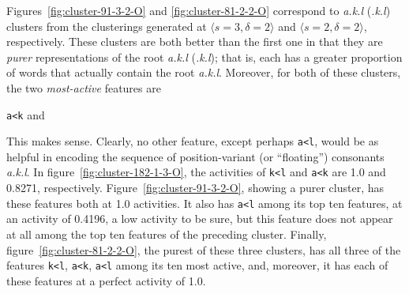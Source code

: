 Figures~\ref{fig:cluster-91-3-2-O} and \ref{fig:cluster-81-2-2-O} correspond to \textit{a.k.l}
(\textit{.k.l}) clusters from the clusterings generated at
$\langle{s}=3,\delta=2 \rangle$ and $\langle s=2, \delta=2 \rangle$, respectively. 
These clusters are both better than the first one in that they are
\emph{purer} representations of the root \textit{a.k.l} (\textit{.k.l}); that is,
each has a greater proportion of words that actually contain the root \textit{a.k.l}.
Moreover, for both of these clusters, the two \emph{most-active} features are 
\begin{center}
 {\large \texttt{a<k}} \quad  and 
\end{center}
This makes sense. Clearly, no other feature, except perhaps \texttt{a<l}, would be as helpful in 
encoding the sequence of  position-variant (or ``floating'') consonants \textit{a.k.l}. In figure~\ref{fig:cluster-182-1-3-O}, the activities of \texttt{k<l} and \texttt{a<k} are 1.0 and 0.8271, respectively.
Figure~\ref{fig:cluster-91-3-2-O}, showing a purer cluster, has these features both at 1.0 activities. It also has \texttt{a<l} among its top ten features, 
at an activity of 0.4196, a low activity to be sure, but this feature does not appear at all among the top ten features of the preceding
cluster. 
Finally, figure~\ref{fig:cluster-81-2-2-O}, the purest of these three clusters, has all three of the features \texttt{k<l}, \texttt{a<k}, \texttt{a<l} among
its ten most active,
and, moreover, it has each of these features at a perfect activity of 1.0.

